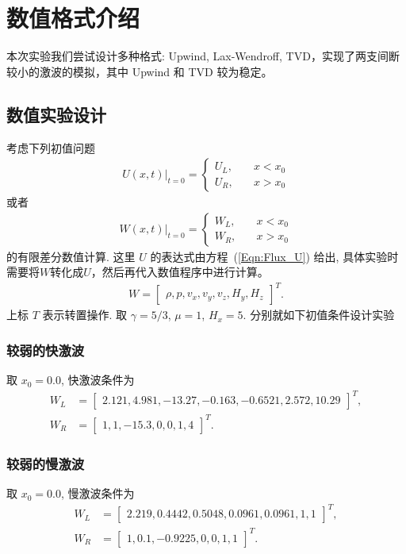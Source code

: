 \documentclass[10.5pt
]{article}
\begin{document}
\section{数值格式介绍}
本次实验我们尝试设计多种格式: Upwind, Lax-Wendroff, TVD，实现了两支间断较小的激波的模拟，其中 Upwind 和 TVD 较为稳定。
\subsection{数值实验设计}

考虑下列初值问题
\begin{align}
U(x,t)|_{t=0} = \left\{ \begin{array}{ll}
U_L, & \quad x < x_0 \\
U_R, & \quad x > x_0
\end{array} \right.
\end{align}
或者
\begin{align}
W(x,t)|_{t=0} = \left\{ \begin{array}{ll}
W_L, & \quad x < x_0 \\
W_R, & \quad x > x_0
\end{array} \right.
\end{align}
的有限差分数值计算. 这里 $U$ 的表达式由方程~(\ref{Eqn:Flux_U}) 给出, 具体实验时需要将$W$转化成$U$，然后再代入数值程序中进行计算。
\begin{align}
W = \left[ \begin{array}{ccccccc}
\rho,
p,
v_x,
v_y,
v_z,
H_y,
H_z
\end{array} \right]^T.
\end{align}
上标 $T$ 表示转置操作. 取 $\gamma=5/3$, $\mu=1$, $H_x=5$. 分别就如下初值条件设计实验

\subsubsection{较弱的快激波}
取 $x_0 = 0.0$, 快激波条件为
\begin{align}
W_L &= \left[\begin{array}{cccccc}
2.121,
4.981,
-13.27,
-0.163,
-0.6521,
2.572,
10.29
\end{array}\right]^T,
\nonumber\\
W_R &= \left[\begin{array}{ccccccc}
1,
1,
-15.3,
0,
0,
1,
4
\end{array}\right]^T. \label{Eqn:WFast}
\end{align}

\subsubsection{较弱的慢激波}
取 $x_0 = 0.0$, 慢激波条件为
\begin{align}
W_L &= \left[\begin{array}{ccccccc}
2.219,
0.4442,
0.5048,
0.0961,
0.0961,
1,
1
\end{array}\right]^T,
\nonumber\\
W_R &= \left[\begin{array}{ccccccc}
1,
0.1,
-0.9225,
0,
0,
1,
1
\end{array}\right]^T.\label{Eqn:WSlow}
\end{align}
\end{document}
